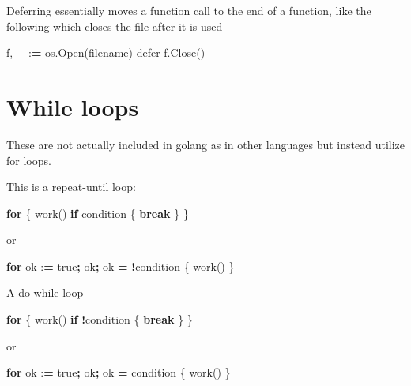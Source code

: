 \documentclass[]{book}
\newenvironment{Shaded}{\begin{snugshade}}{\end{snugshade}}
\newcommand{\ControlFlowTok}[1]{\textcolor[rgb]{0.13,0.29,0.53}{\textbf{#1}}}
\newcommand{\NormalTok}[1]{#1}
\newcommand{\OperatorTok}[1]{\textcolor[rgb]{0.81,0.36,0.00}{\textbf{#1}}}
\begin{document}
Deferring essentially moves a function call to the end of a function, like the following which closes the file after it is used

\begin{Shaded}
\begin{Highlighting}[]
\NormalTok{f, _ :}\OperatorTok{=}\NormalTok{ os.Open(filename)}
\NormalTok{defer f.Close()}
\end{Highlighting}
\end{Shaded}

\hypertarget{while-loops}{%
\section{While loops}\label{while-loops}}

These are not actually included in golang as in other languages but instead utilize for loops.

This is a repeat-until loop:

\begin{Shaded}
\begin{Highlighting}[]
\ControlFlowTok{for}\NormalTok{ \{}
\NormalTok{    work()}
    \ControlFlowTok{if}\NormalTok{ condition \{}
        \ControlFlowTok{break}
\NormalTok{    \}}
\NormalTok{\}}
\end{Highlighting}
\end{Shaded}

or

\begin{Shaded}
\begin{Highlighting}[]
\ControlFlowTok{for}\NormalTok{ ok :}\OperatorTok{=}\NormalTok{ true}\OperatorTok{;}\NormalTok{ ok}\OperatorTok{;}\NormalTok{ ok }\OperatorTok{=} \OperatorTok{!}\NormalTok{condition \{}
\NormalTok{    work()}
\NormalTok{\}}
\end{Highlighting}
\end{Shaded}

A do-while loop

\begin{Shaded}
\begin{Highlighting}[]
\ControlFlowTok{for}\NormalTok{ \{}
\NormalTok{    work()}
    \ControlFlowTok{if} \OperatorTok{!}\NormalTok{condition \{}
        \ControlFlowTok{break}
\NormalTok{    \}}
\NormalTok{\}}
\end{Highlighting}
\end{Shaded}

or

\begin{Shaded}
\begin{Highlighting}[]
\ControlFlowTok{for}\NormalTok{ ok :}\OperatorTok{=}\NormalTok{ true}\OperatorTok{;}\NormalTok{ ok}\OperatorTok{;}\NormalTok{ ok }\OperatorTok{=}\NormalTok{ condition \{}
\NormalTok{    work()}
\NormalTok{\}}
\end{Highlighting}
\end{Shaded}
\end{document}
